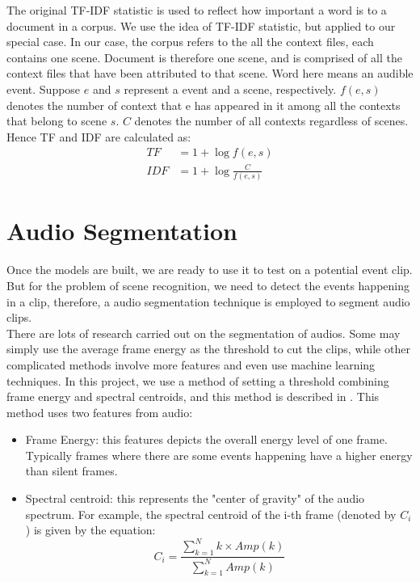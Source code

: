 The original TF-IDF statistic is used to reflect how important a word is to a document in a corpus. 
We use the idea of TF-IDF statistic, but applied to our special case. 
In our case, the corpus refers to the all the context files, each contains one scene. 
Document is therefore one scene, and is comprised of all the context files that have been attributed to that scene. 
Word here means an audible event. 
Suppose $e$ and $s$ represent a event and a scene, respectively. 
$f(e,s)$ denotes the number of context that e has appeared in it among all the contexts that belong to scene $s$.  
$C$ denotes the number of all contexts regardless of scenes. 
Hence TF and IDF are calculated as: 
\begin{equation}
\begin{split}
 TF &= 1 + \log{f(e,s)} \\ 
 IDF &= 1 + \log{\frac{C}{f(e,s)}}
\end{split}
\end{equation} 

\section{Audio Segmentation}
Once the models are built, we are ready to use it to test on a potential event clip. 
But for the problem of scene recognition, we need to detect the events happening in a clip, therefore, a audio segmentation technique is employed to segment audio clips. \\ 

There are lots of research carried out on the segmentation of audios.
Some may simply use the average frame energy as the threshold to cut the clips, while other complicated methods involve more features and even use machine learning techniques. 
In this project, we use a method of setting a threshold combining frame energy and spectral centroids, and this method is described in \cite{giannakopoulos2009method}.
This method uses two features from audio:
\begin{itemize}
\item{Frame Energy: this features depicts the overall energy level of one frame. Typically frames where there are some events happening have a higher energy than silent frames.}
\item{Spectral centroid: this represents the "center of gravity" of the audio spectrum. For example, the spectral centroid of the i-th frame (denoted by $ C_i$) is given by the equation:
\[
C_i = \frac{\sum\limits_{k=1}^Nk\times Amp(k)}{\sum\limits_{k=1}^NAmp(k)}
\]
}
\end{itemize}

